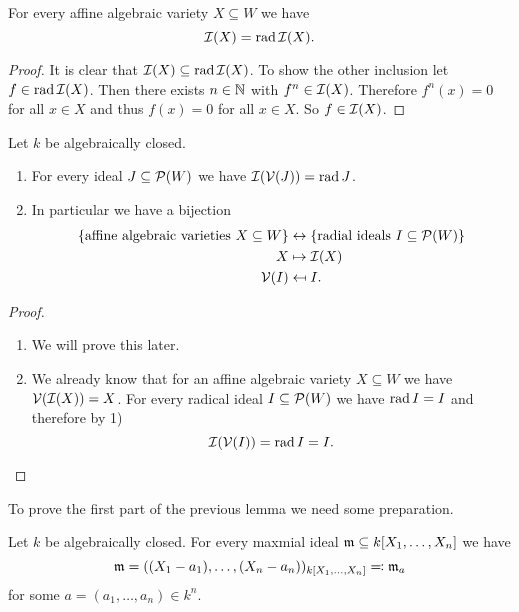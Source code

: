 \begin{lem}
  For every affine algebraic variety $X \subseteq W$ we have
  \[
    \mathcal{I}(X)
  = \operatorname{rad} \mathcal{I}(X).
  \]
\end{lem}
\begin{proof}
  It is clear that $\mathcal{I}(X) \subseteq \operatorname{rad} \mathcal{I}(X)$.
  To show the other inclusion let \mbox{$f \in \operatorname{rad} \mathcal{I}(X)$}.
  Then there exists $n \in \mathbb{N}$ with $f^n \in \mathcal{I}(X)$.
  Therefore $f^n(x) = 0$ for all $x \in X$ and thus $f(x) = 0$ for all $x \in X$.
  So $f \in \mathcal{I}(X)$.
\end{proof}


\begin{prop}
  Let $k$ be algebraically closed.
  \begin{enumerate}[label=\emph{\alph*)},leftmargin=*]
    \item
      For every ideal $J \subseteq \mathcal{P}(W)$ we have $\mathcal{I}(\mathcal{V}(J)) = \operatorname{rad} J$.
    \item
      In particular we have a bijection
      \begin{align*}
                          \{\text{affine algebraic varieties $X \subseteq W$}\}
        &\leftrightarrow  \{\text{radial ideals $I \subseteq \mathcal{P}(W)$}\} \\
                          X
        &\mapsto          \mathcal{I}(X) \\
                          \mathcal{V}(I)
        &\mapsfrom        I.
    \end{align*}
  \end{enumerate}
\end{prop}
\begin{proof}
  \begin{enumerate}[label=\emph{\alph*)},leftmargin=*]
    \item
      We will prove this later.
    \item
      We already know that for an affine algebraic variety $X \subseteq W$ we have $\mathcal{V}(\mathcal{I}(X)) = X$.
      For every radical ideal $I \subseteq \mathcal{P}(W)$ we have $\operatorname{rad} I = I$ and therefore by 1)
      \[
          \mathcal{I}(\mathcal{V}(I))
        = \operatorname{rad} I
        = I.
      \]
    \qedhere
  \end{enumerate}
\end{proof}


To prove the first part of the previous lemma we need some preparation.


\begin{thrm}
  Let $k$ be algebraically closed.
  For every maxmial ideal \mbox{$\mathfrak{m} \subseteq k[X_1, \dotsc, X_n]$} we have
  \[
              \mathfrak{m}
    =         ( (X_1 - a_1), \dotsc, (X_n - a_n) )_{k[X_1, \dotsc, X_n]}
    \eqqcolon \mathfrak{m}_a
  \]
  for some $a = (a_1, \dotsc, a_n) \in k^n$.
\end{thrm}


